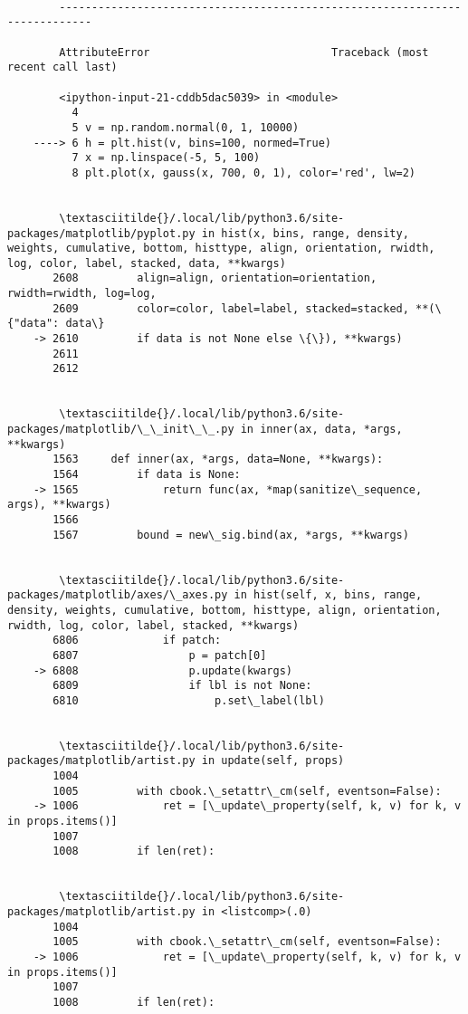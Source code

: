 \documentclass[11pt]{article}
\begin{document}
    \begin{Verbatim}[commandchars=\\\{\}]

        ---------------------------------------------------------------------------

        AttributeError                            Traceback (most recent call last)

        <ipython-input-21-cddb5dac5039> in <module>
          4 
          5 v = np.random.normal(0, 1, 10000)
    ----> 6 h = plt.hist(v, bins=100, normed=True)
          7 x = np.linspace(-5, 5, 100)
          8 plt.plot(x, gauss(x, 700, 0, 1), color='red', lw=2)


        \textasciitilde{}/.local/lib/python3.6/site-packages/matplotlib/pyplot.py in hist(x, bins, range, density, weights, cumulative, bottom, histtype, align, orientation, rwidth, log, color, label, stacked, data, **kwargs)
       2608         align=align, orientation=orientation, rwidth=rwidth, log=log,
       2609         color=color, label=label, stacked=stacked, **(\{"data": data\}
    -> 2610         if data is not None else \{\}), **kwargs)
       2611 
       2612 


        \textasciitilde{}/.local/lib/python3.6/site-packages/matplotlib/\_\_init\_\_.py in inner(ax, data, *args, **kwargs)
       1563     def inner(ax, *args, data=None, **kwargs):
       1564         if data is None:
    -> 1565             return func(ax, *map(sanitize\_sequence, args), **kwargs)
       1566 
       1567         bound = new\_sig.bind(ax, *args, **kwargs)


        \textasciitilde{}/.local/lib/python3.6/site-packages/matplotlib/axes/\_axes.py in hist(self, x, bins, range, density, weights, cumulative, bottom, histtype, align, orientation, rwidth, log, color, label, stacked, **kwargs)
       6806             if patch:
       6807                 p = patch[0]
    -> 6808                 p.update(kwargs)
       6809                 if lbl is not None:
       6810                     p.set\_label(lbl)


        \textasciitilde{}/.local/lib/python3.6/site-packages/matplotlib/artist.py in update(self, props)
       1004 
       1005         with cbook.\_setattr\_cm(self, eventson=False):
    -> 1006             ret = [\_update\_property(self, k, v) for k, v in props.items()]
       1007 
       1008         if len(ret):


        \textasciitilde{}/.local/lib/python3.6/site-packages/matplotlib/artist.py in <listcomp>(.0)
       1004 
       1005         with cbook.\_setattr\_cm(self, eventson=False):
    -> 1006             ret = [\_update\_property(self, k, v) for k, v in props.items()]
       1007 
       1008         if len(ret):



\end{Verbatim}
\end{document}
